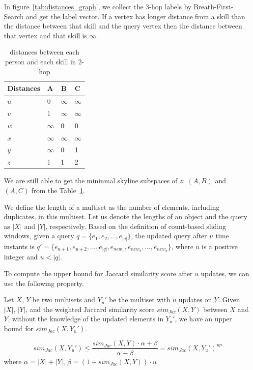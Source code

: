In figure~\ref{tab:distances_graph}, we collect the $3$-hop labels by Breath-First-Search and get the label vector. If a vertex has longer distance from a skill than the distance between that skill and the query vertex then the distance between that vertex and that skill is $\infty$.



\begin{table}[h]
    \centering
    \begin{tabular}{llll}
    \hline
    Distances & A & B & C \\ \hline
    $u$       & 0 & $\infty$ & $\infty$ \\ \hline
    $v$       & 1 & $\infty$ & $\infty$ \\ \hline
    $w$       & $\infty$ & 0 & 0 \\ \hline
    $x$       & $\infty$ & $\infty$ & $\infty$ \\ \hline
    $y$       & $\infty$ & 0 & 1 \\ \hline
    $z$       & 1 & 1 & 2 \\ \hline
    \end{tabular}
    \caption{\label{font-table} distances between each person and each skill in 2-hop}
    \label{tab:d_hops_distance}
\end{table}
We are still able to get the mininmal skyline subspaces of $z$: $(A, B)$ and $(A, C)$ from the Table~\ref{tab:d_hops_distance}.


We define the length of a multiset as the number of elements, including duplicates, in this multiset. Let us denote the lengths of an object and the query as $|X|$ and $|Y|$, respectively. Based on the definition of count-based sliding windows, %
%
%
given a query $q=\{e_1, e_2,..., e_{|q|}\}$, the updated query after $u$ time instants is $q'=\{e_{u+1}, e_{u+2}, ..., e_{|q|}, e_{new_1}, e_{new_2}, ..., e_{new_u}\}$, where $u$ is a positive integer and $u<|q|$.

To compute the upper bound for Jaccard similarity score after $u$ updates, we can use the following property.

\begin{property}%
Let $X$, $Y$ be two multisets and $Y_u'$ be the multiset with $u$ updates on $Y$. Given $|X|$, $|Y|$, and the weighted Jaccard similarity score $sim_{Jac}(X, Y)$ between $X$ and $Y$, without the knowledge of the updated elements in $Y_u'$, we have an upper bound for $sim_{Jac}(X, Y_u')$.

$$sim_{Jac}(X, Y_u') \leq \frac{sim_{Jac}(X, Y)\cdot \alpha+\beta}{\alpha-\beta} = sim_{Jac}(X, Y_u')^{up}$$ where $\alpha = |X| + |Y|$, $\beta = (1+sim_{Jac}(X, Y))\cdot u$
\end{property}


